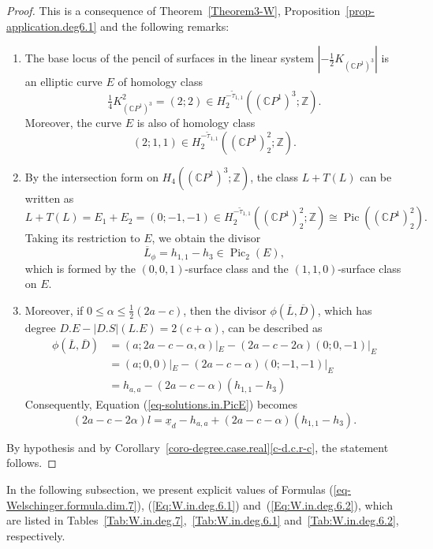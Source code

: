 \documentclass[11pt]{amsart}
\numberwithin{equation}{section}
\theoremstyle{definition}
\theoremstyle{plain}
\theoremstyle{remark}
\newcommand{\Z}{\mathbb{Z}}
\newcommand{\C}{\mathbb{C}}
\DeclareMathOperator{\Pic}{Pic}
\begin{document}
\begin{proof}
This is a consequence of Theorem~\ref{Theorem3-W}, Proposition~\ref{prop-application.deg6.1}  and the following remarks:
    \begin{enumerate}
        \item The base locus of the pencil of surfaces in the linear system $|-\frac{1}{2}K_{(\C P^1)^3}|$ is an elliptic curve $E$ of homology class 
        $$\tfrac{1}{4}K_{(\C P^1)^3}^2=(2;2)\in H_2^{-\tilde{\tau}_{1,1}}\left(\left(\C P^1\right)^3;\Z\right).$$
        Moreover, the curve $E$ is also of homology class 
        $$(2;1,1)\in  H_2^{-\tilde{\tau}_{1,1}}\left(\left(\C P^1\right)^2_2;\Z\right).$$
        
      \item By the intersection form on $H_4((\C P^1)^3;\mathbb{Z})$, the class $L+T(L)$ can be written as
        $$L+T(L)=E_1+E_2=(0;-1,-1)\in H_2^{-\tilde{\tau}_{1,1}}\left(\left(\C P^1\right)^2_2;\Z\right)\cong \Pic\left(\left(\C P^1\right)^2_2\right).$$ 
        Taking its restriction to $E$,  we obtain the divisor
        $$\overline{L}_{\phi}=h_{1,1}-h_3 \in \Pic_2(E),$$
        which is formed by the $(0,0,1)$-surface class  and the  $(1,1,0)$-surface class on $E$.
        \item Moreover, if $0\leq \alpha\leq \frac{1}{2}(2a-c)$, then the divisor $\phi(\overline{L},\overline{D})$, which has degree $D.E-|D.S|(L.E)= 2(c+\alpha)$,  can be described as
        \begin{align*}
            \phi\left(\overline{L},\overline{D}\right)&=(a;2a-c-\alpha,\alpha)|_E-(2a-c-2\alpha)(0;0,-1)|_E\\
           & =(a;0,0)|_E-(2a-c-\alpha) (0;-1,-1)|_E\\
           & = h_{a,a}-(2a-c-\alpha)(h_{1,1}-h_3)
        \end{align*} 
        Consequently, Equation (\ref{eq-solutions.in.PicE}) becomes
\begin{equation}
     (2a-c-2\alpha)l=\underline{x}_{d}-h_{a,a}+(2a-c-\alpha)(h_{1,1}-h_3).
\end{equation}
    \end{enumerate}
By hypothesis and by Corollary~\ref{coro-degree.case.real}\eqref{c-d.c.r-c}, the statement follows.
\end{proof}

In the following subsection, we present explicit values of Formulas (\ref{eq-Welschinger.formula.dim.7}),   (\ref{Eq:W.in.deg.6.1}) and~(\ref{Eq:W.in.deg.6.2}), which are listed in Tables~\ref{Tab:W.in.deg.7},~\ref{Tab:W.in.deg.6.1} and~\ref{Tab:W.in.deg.6.2}, respectively.
\end{document}
